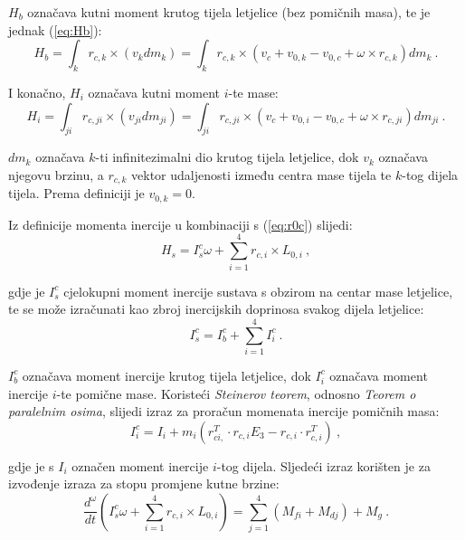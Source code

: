 \documentclass[11pt,a4paper]{article}
\begin{document}
$H_{b}$ označava kutni moment krutog tijela letjelice (bez pomičnih masa), te je jednak (\ref{eq:Hb}):
\begin{equation}
H_{b} = \int_{k} r_{c,k} \times (v_{k}dm_{k}) = \int_{k} r_{c,k} \times (v_{c} + v_{0,k} - v_{0,c} + \omega \times r_{c,k})dm_{k} \ .
\label{eq:Hb}
\end{equation}

I konačno, $H_{i}$ označava kutni moment $i$-te mase:
\begin{equation}
H_{i} = \int_{ji} r_{c,ji} \times (v_{ji}dm_{ji}) = \int_{ji} r_{c,ji} \times (v_{c} + v_{0,i} - v_{0,c} + \omega \times r_{c,ji})dm_{ji} \ .
\label{eq:Hi}
\end{equation}

$dm_{k}$ označava $k$-ti infinitezimalni dio krutog tijela letjelice, dok $v_{k}$ označava njegovu brzinu, a $r_{c,k}$ vektor udaljenosti između centra mase tijela te $k$-tog dijela tijela. Prema definiciji je $v_{0,k} = 0$. 

Iz definicije momenta inercije u kombinaciji s (\ref{eq:r0c}) slijedi:
\begin{equation}
H_{s} = I_{s}^{c}\omega + \sum_{i=1}^{4}r_{c,i} \times L_{0,i} \ ,
\label{eq:Hs2}
\end{equation}

gdje je $I_{s}^{c}$ cjelokupni moment inercije sustava s obzirom na centar mase letjelice, te se može izračunati kao zbroj inercijskih doprinosa svakog dijela letjelice:
\begin{equation}
I_{s}^{c} = I_{b}^{c} + \sum_{i=1}^{4}I_{i}^{c} \ .
\label{eq:Ics}
\end{equation}

$I_{b}^{c}$ označava moment inercije krutog tijela letjelice, dok $I_{i}^{c}$ označava moment inercije $i$-te pomične mase. Koristeći \textit{Steinerov teorem}, odnosno \textit{Teorem o paralelnim osima}, slijedi izraz za proračun momenata inercije pomičnih masa:
\begin{equation}
I_{i}^{c} = I_{i} + m_{i} \left(  r_{ci,}^{T} \cdot r_{c,i}E_{3} - r_{c,i}\cdot r_{c,i}^{T} \right) \ ,
\label{eq:Iic}
\end{equation}

gdje je s $I_{i}$ označen moment inercije $i$-tog dijela. Sljedeći izraz korišten je za izvođenje izraza za stopu promjene kutne brzine:
\begin{equation}
\frac{d^{\omega}}{dt} \left( I_{s}^{c} \omega + \sum_{i=1}^{4} r_{c,i}\times L_{0,i}  \right) = \sum_{j=1}^{4}(M_{fi} + M_{dj}) + M_{g} \ .
\label{eq:dtM}
\end{equation}
\end{document}
